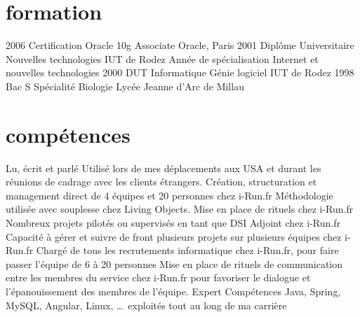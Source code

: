 \documentclass{friggeri-cv} 	%
\begin{document}

\section{formation}

\begin{entrylist}
\entry
{2006}
{Certification Oracle {\normalfont 10g Associate}}
{Oracle, Paris}
{}
\entry
{2001}
{Diplôme Universitaire {\normalfont Nouvelles technologies}}
{IUT de Rodez}
{Année de spécialisation Internet et nouvelles technologies}
\entry
{2000}
{DUT {\normalfont Informatique Génie logiciel}}
{IUT de Rodez}
{}
\entry
{1998}
{Bac S {\normalfont Spécialité Biologie}}
{Lycée Jeanne d’Arc de Millau}
{}
\end{entrylist}


\section{compétences}

\begin{capabilitize}
		{Lu, écrit et parlé}
		{Utilisé lors de mes déplacements aux USA et durant les réunions de cadrage avec les clients
		étrangers.}
		{}
		{Création, structuration et management direct de 4 équipes et 20 personnes chez i-Run.fr}
		{}
		{Méthodologie utilisée avec souplesse chez Living Objects. Mise en place de rituels chez i-Run.fr}
		{}
		{Nombreux projets pilotés ou supervisés en tant que DSI Adjoint chez i-Run.fr}
		{Capacité à gérer et suivre de front plusieurs projets sur plusieurs équipes chez i-Run.fr}
		{}
		{Chargé de tous les recrutements informatique chez i-Run.fr, pour faire passer l’équipe de 6 à 20 personnes}
		{}
		{Mise en place de rituels de communication entre les membres du service chez i-Run.fr pour favoriser le dialogue 
        et l’épanouissement des membres de l’équipe.}
		{Expert}
		{Compétences Java, Spring, MySQL, Angular, Linux, \dots\ exploités tout au long de ma carrière}
\end{capabilitize}
\end{document}
